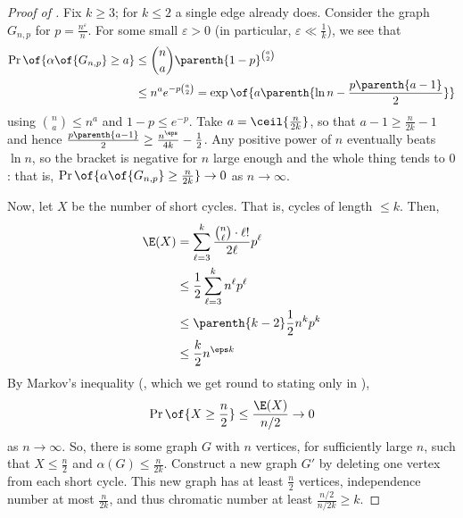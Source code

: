 \begin{proof}[Proof of ]
    Fix $k \geq 3$; for $k \leq 2$ a single edge already does. Consider the graph $G_{n, p}$ for $p = \frac{n^{\varepsilon}}{n}$. For some small $\varepsilon > 0$ (in particular, $\varepsilon \ll \frac{1}{k}$), we see that
    \begin{align*}
        \Pr\of{\alpha\of{G_{n, p}} \geq a} &\leq \binom{n}{a} \parenth{1 - p}^{\binom{a}{2}}  \\
        & \leq n^a e^{-p \binom{a}{2}} = \exp\of{a \parenth{\ln n - \frac{p \parenth{a - 1}}{2}}}
    \end{align*}
    using $\binom{n}{a} \leq n^a$ and $1 - p \leq e^{-p}$. Take $a = \ceil{\frac{n}{2k}}$, so that $a - 1 \geq \frac{n}{2k} - 1$ and hence $\frac{p \parenth{a - 1}}{2} \geq \frac{n^{\eps}}{4k} - \frac{1}{2}$. Any positive power of $n$ eventually beats $\ln n$, so the bracket is negative for $n$ large enough and the whole thing tends to $0$: that is, $\Pr\of{\alpha\of{G_{n, p}} \geq \frac{n}{2k}} \to 0$ as $n \to \infty$.

    Now, let $X$ be the number of short cycles. That is, cycles of length $\leq k$. Then,
    \begin{align*}
        \E(X) &= \sum_{\ell = 3}^{k} \frac{\binom{n}{\ell} \cdot \ell !}{2\ell} p^{\ell} \\
        &\leq \frac{1}{2} \sum_{\ell = 3}^{k} n^{\ell} p^{\ell} \\
        &\leq \parenth{k - 2} \frac{1}{2} n^k p^k \\
        &\leq \frac{k}{2} n^{\eps k}
    \end{align*}
    By Markov's inequality (, which we get round to stating only in ),
    \begin{align*}
        \Pr\of{X \geq \frac{n}{2}} \leq \frac{\E(X)}{n / 2} \to 0
    \end{align*}
    as $n \to \infty$. So, there is some graph $G$ with $n$ vertices, for sufficiently large $n$, such that $X \leq \frac{n}{2}$ and $\alpha(G) \leq \frac{n}{2k}$. Construct a new graph $G'$ by deleting one vertex from each short cycle. This new graph has at least $\frac{n}{2}$ vertices, independence number at most $\frac{n}{2k}$, and thus chromatic number at least $\frac{n/2}{n/2k} \geq k$.
\end{proof}
